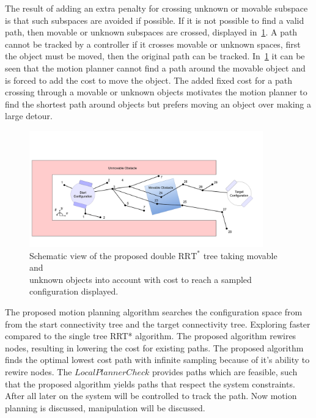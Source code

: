 The result of adding an extra penalty for crossing unknown or movable subspace is that such subspaces are avoided if possible. If it is not possible to find a valid path, then movable or unknown subspaces are crossed, displayed in~\cref{fig:double_rrt_alg}. A path cannot be tracked by a controller if it crosses movable or unknown spaces, first the object must be moved, then the original path can be tracked. In~\cref{fig:double_rrt_alg} it can be seen that the motion planner cannot find a path around the movable object and is forced to add the cost to move the object. The added fixed cost for a path crossing through a movable or unknown objects motivates the motion planner to find the shortest path around objects but prefers moving an object over making a large detour.\bs

\begin{figure}[H]
    \centering
    \includegraphics[width=0.9\textwidth]{figures/rrt_with_costs.png}
    \caption{Schematic view of the proposed double $\text{RRT}^*$ tree taking movable and\\unknown objects into account with cost to reach a sampled configuration displayed.}
    \label{fig:double_rrt_alg}
\end{figure}

The proposed motion planning algorithm searches the configuration space from from the start connectivity tree and the target connectivity tree. Exploring faster compared to the single tree \ac{RRT*} algorithm. The proposed algorithm rewires nodes, resulting in lowering the cost for existing paths. The proposed algorithm finds the optimal lowest cost path with infinite sampling because of it's ability to rewire nodes. The $LocalPlannerCheck$ provides paths which are feasible, such that the proposed algorithm yields paths that respect the system constraints. After all later on the system will be controlled to track the path. Now motion planning is discussed, manipulation will be discussed.
